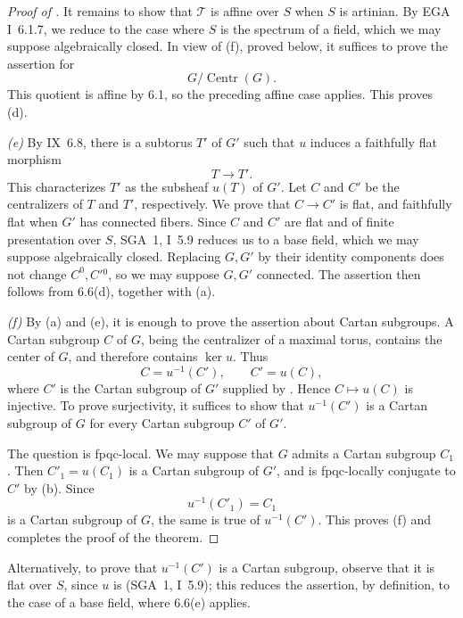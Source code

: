 \begin{proof}[Proof of ]
It remains to show that \(\mathcal T\) is affine over \(S\) when
\(S\) is artinian. By EGA I~6.1.7, we reduce to the case where
\(S\) is the spectrum of a field, which we may suppose algebraically
closed. In view of \textup{(f)}, proved below, it suffices to prove
the assertion for
\[
  G/\operatorname{Centr}(G).
\]
This quotient is affine by 6.1, so the preceding affine case
applies. This proves \textup{(d)}.

\emph{(e)} By IX~6.8, there is a subtorus \(T'\) of \(G'\) such
that \(u\) induces a faithfully flat morphism
\[
  T\longrightarrow T'.
\]
This characterizes \(T'\) as the subsheaf \(u(T)\) of \(G'\). Let
\(C\) and \(C'\) be the centralizers of \(T\) and \(T'\),
respectively. We prove that \(C\to C'\) is flat, and faithfully flat
when \(G'\) has connected fibers. Since \(C\) and \(C'\) are flat
and of finite presentation over \(S\), SGA~1, I~5.9 reduces us to a
base field, which we may suppose algebraically closed. Replacing
\(G,G'\) by their identity components does not change \(C^0,C'{}^0\),
so we may suppose \(G,G'\) connected. The assertion then follows
from 6.6(d), together with \textup{(a)}.

\emph{(f)} By \textup{(a)} and \textup{(e)}, it is enough to prove
the assertion about Cartan subgroups. A Cartan subgroup \(C\) of
\(G\), being the centralizer of a maximal torus, contains the center
of \(G\), and therefore contains \(\ker u\). Thus
\[
  C=u^{-1}(C'),
  \qquad C'=u(C),
\]
where \(C'\) is the Cartan subgroup of \(G'\) supplied by
\textup{}. Hence \(C\mapsto u(C)\) is injective. To prove
surjectivity, it suffices to show that \(u^{-1}(C')\) is a Cartan
subgroup of \(G\) for every Cartan subgroup \(C'\) of \(G'\).

The question is fpqc-local. We may suppose that \(G\) admits a
Cartan subgroup \(C_1\). Then \(C'_1=u(C_1)\) is a Cartan subgroup
of \(G'\), and is fpqc-locally conjugate to \(C'\) by \textup{(b)}.
Since
\[
  u^{-1}(C'_1)=C_1
\]
is a Cartan subgroup of \(G\), the same is true of \(u^{-1}(C')\).
This proves \textup{(f)} and completes the proof of the theorem.
\end{proof}

Alternatively, to prove that \(u^{-1}(C')\) is a Cartan subgroup,
observe that it is flat over \(S\), since \(u\) is (SGA~1, I~5.9);
this reduces the assertion, by definition, to the case of a base
field, where 6.6(e) applies.

